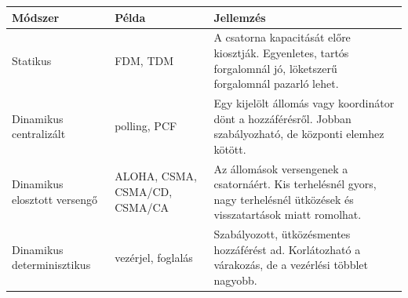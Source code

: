 
\begin{tabularx}{\textwidth}{L{30mm}L{30mm}X}
\toprule
\textbf{Módszer} & \textbf{Példa} & \textbf{Jellemzés} \\
\midrule
Statikus & FDM, TDM & A csatorna kapacitását előre kiosztják. Egyenletes, tartós forgalomnál jó, löketszerű forgalomnál pazarló lehet. \\
Dinamikus centralizált & polling, PCF & Egy kijelölt állomás vagy koordinátor dönt a hozzáférésről. Jobban szabályozható, de központi elemhez kötött. \\
Dinamikus elosztott versengő & ALOHA, CSMA, CSMA/CD, CSMA/CA & Az állomások versengenek a csatornáért. Kis terhelésnél gyors, nagy terhelésnél ütközések és visszatartások miatt romolhat. \\
Dinamikus determinisztikus & vezérjel, foglalás & Szabályozott, ütközésmentes hozzáférést ad. Korlátozható a várakozás, de a vezérlési többlet nagyobb. \\
\bottomrule
\end{tabularx}
